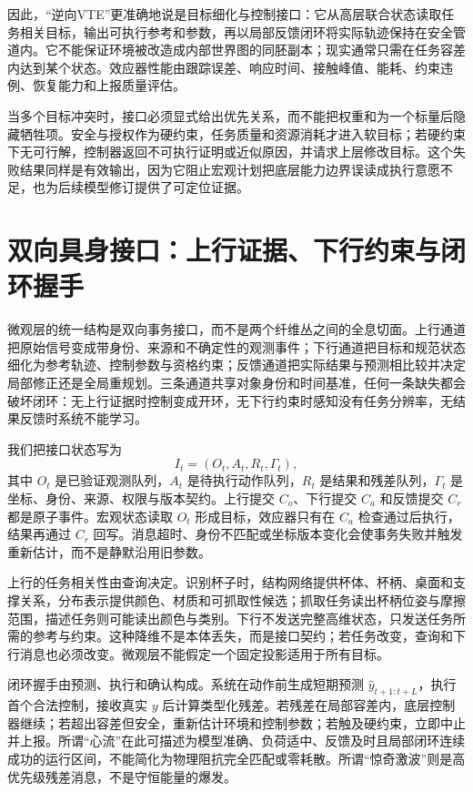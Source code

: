 因此，“逆向VTE”更准确地说是目标细化与控制接口：它从高层联合状态读取任务相关目标，输出可执行参考和参数，再以局部反馈闭环将实际轨迹保持在安全管道内。它不能保证环境被改造成内部世界图的同胚副本；现实通常只需在任务容差内达到某个状态。效应器性能由跟踪误差、响应时间、接触峰值、能耗、约束违例、恢复能力和上报质量评估。

当多个目标冲突时，接口必须显式给出优先关系，而不能把权重和为一个标量后隐藏牺牲项。安全与授权作为硬约束，任务质量和资源消耗才进入软目标；若硬约束下无可行解，控制器返回不可执行证明或近似原因，并请求上层修改目标。这个失败结果同样是有效输出，因为它阻止宏观计划把底层能力边界误读成执行意愿不足，也为后续模型修订提供了可定位证据。

\section{双向具身接口：上行证据、下行约束与闭环握手}
\label{sec:section_2301}

微观层的统一结构是双向事务接口，而不是两个纤维丛之间的全息切面。上行通道把原始信号变成带身份、来源和不确定性的观测事件；下行通道把目标和规范状态细化为参考轨迹、控制参数与资格约束；反馈通道把实际结果与预测相比较并决定局部修正还是全局重规划。三条通道共享对象身份和时间基准，任何一条缺失都会破坏闭环：无上行证据时控制变成开环，无下行约束时感知没有任务分辨率，无结果反馈时系统不能学习。

我们把接口状态写为
\[
I_t=(O_t,A_t,R_t,\Gamma_t),
\]
其中 $O_t$ 是已验证观测队列，$A_t$ 是待执行动作队列，$R_t$ 是结果和残差队列，$\Gamma_t$ 是坐标、身份、来源、权限与版本契约。上行提交 $C_o$、下行提交 $C_a$ 和反馈提交 $C_r$ 都是原子事件。宏观状态读取 $O_t$ 形成目标，效应器只有在 $C_a$ 检查通过后执行，结果再通过 $C_r$ 回写。消息超时、身份不匹配或坐标版本变化会使事务失败并触发重新估计，而不是静默沿用旧参数。

上行的任务相关性由查询决定。识别杯子时，结构网络提供杯体、杯柄、桌面和支撑关系，分布表示提供颜色、材质和可抓取性候选；抓取任务读出杯柄位姿与摩擦范围，描述任务则可能读出颜色与类别。下行不发送完整高维状态，只发送任务所需的参考与约束。这种降维不是本体丢失，而是接口契约；若任务改变，查询和下行消息也必须改变。微观层不能假定一个固定投影适用于所有目标。

闭环握手由预测、执行和确认构成。系统在动作前生成短期预测 $\hat y_{t+1:t+L}$，执行首个合法控制，接收真实 $y$ 后计算类型化残差。若残差在局部容差内，底层控制器继续；若超出容差但安全，重新估计环境和控制参数；若触及硬约束，立即中止并上报。所谓“心流”在此可描述为模型准确、负荷适中、反馈及时且局部闭环连续成功的运行区间，不能简化为物理阻抗完全匹配或零耗散。所谓“惊奇激波”则是高优先级残差消息，不是守恒能量的爆发。

